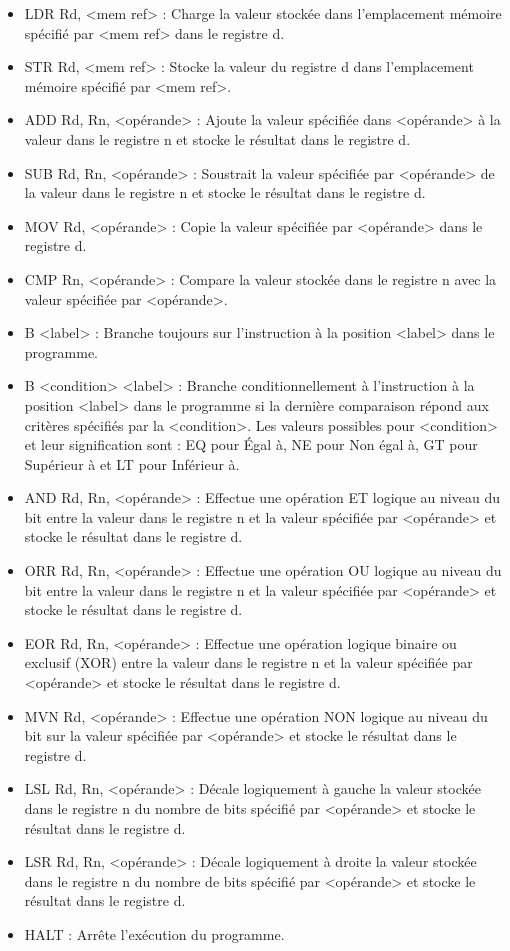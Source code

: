 \documentclass[12pt,a4paper]{article}
\begin{document}
\begin{itemize}
\item \textsf{LDR Rd, <mem ref>} : Charge la valeur stockée dans l'emplacement mémoire spécifié par <mem ref> dans le registre d.\medskip
\item \textsf{STR Rd, <mem ref>} : Stocke la valeur du registre d dans l'emplacement mémoire spécifié par <mem ref>.\medskip
\item \textsf{ADD Rd, Rn, <opérande>} : Ajoute la valeur spécifiée dans <opérande> à la valeur dans le registre n et stocke le résultat dans le registre d.\medskip
\item \textsf{SUB Rd, Rn, <opérande>} :  Soustrait la valeur spécifiée par <opérande> de la valeur dans le registre n et stocke le résultat dans le registre d.\medskip 
\item \textsf{MOV Rd, <opérande>} : Copie la valeur spécifiée par <opérande> dans le registre d.\medskip
\item \textsf{CMP Rn, <opérande>} : Compare la valeur stockée dans le registre n avec la valeur spécifiée par <opérande>.\medskip
\item \textsf{B <label>} : Branche toujours sur l'instruction à la position <label> dans le programme.\medskip
\item \textsf{B <condition> <label>} : Branche conditionnellement à l'instruction à la position <label> dans le programme si la dernière comparaison répond aux critères spécifiés par la <condition>. 
Les valeurs possibles pour <condition> et leur signification sont : EQ pour Égal à, NE pour Non égal à, GT pour Supérieur à et LT pour Inférieur à.\medskip
\item \textsf{AND Rd, Rn, <opérande>} :  Effectue une opération ET logique au niveau du bit entre la valeur dans le registre n et la valeur spécifiée par <opérande> et stocke le résultat dans le registre d.\medskip
\item \textsf{ORR Rd, Rn, <opérande>} :  Effectue une opération OU logique au niveau du bit entre la valeur dans le registre n et la valeur spécifiée par <opérande> et stocke le résultat dans le registre d.\medskip
\item \textsf{EOR Rd, Rn, <opérande>} :  Effectue une opération logique binaire ou exclusif (XOR) entre la valeur dans le registre n et la valeur spécifiée par <opérande> et stocke le résultat dans le registre d.\medskip
\item \textsf{MVN Rd, <opérande>} : Effectue une opération NON logique au niveau du bit sur la valeur spécifiée par <opérande> et stocke le résultat dans le registre d.\medskip
\item \textsf{LSL Rd, Rn, <opérande>} : Décale logiquement à gauche la valeur stockée dans le registre n du nombre de bits spécifié par <opérande> et stocke le résultat dans le registre d.\medskip
\item \textsf{LSR Rd, Rn, <opérande>} : Décale logiquement à droite la valeur stockée dans le registre n du nombre de bits spécifié par <opérande> et stocke le résultat dans le registre d.\medskip
\item \textsf{HALT} : Arrête l'exécution du programme. 
\end{itemize}
    
\end{document}
